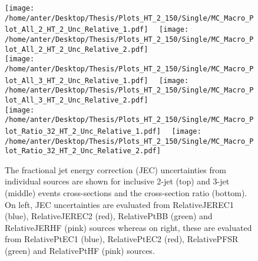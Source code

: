 \begin{figure}[!hbtp]
\hspace*{-5mm}\texttt{[image: /home/anter/Desktop/Thesis/Plots\_HT\_2\_150/Single/MC\_Macro\_Plot\_All\_2\_HT\_2\_Unc\_Relative\_1.pdf]}%
~~\texttt{[image: /home/anter/Desktop/Thesis/Plots\_HT\_2\_150/Single/MC\_Macro\_Plot\_All\_2\_HT\_2\_Unc\_Relative\_2.pdf]}\\
\hspace*{-5mm}\texttt{[image: /home/anter/Desktop/Thesis/Plots\_HT\_2\_150/Single/MC\_Macro\_Plot\_All\_3\_HT\_2\_Unc\_Relative\_1.pdf]}%
~~\texttt{[image: /home/anter/Desktop/Thesis/Plots\_HT\_2\_150/Single/MC\_Macro\_Plot\_All\_3\_HT\_2\_Unc\_Relative\_2.pdf]}\\
\hspace*{-5mm}\texttt{[image: /home/anter/Desktop/Thesis/Plots\_HT\_2\_150/Single/MC\_Macro\_Plot\_Ratio\_32\_HT\_2\_Unc\_Relative\_1.pdf]}%
~~\texttt{[image: /home/anter/Desktop/Thesis/Plots\_HT\_2\_150/Single/MC\_Macro\_Plot\_Ratio\_32\_HT\_2\_Unc\_Relative\_2.pdf]}
\caption[The fractional jet energy correction (JEC) uncertainties from individual sources (Part II).]{The fractional jet energy correction (JEC) uncertainties from individual sources are shown for inclusive 2-jet (top) and 3-jet (middle) events cross-sections and the cross-section ratio \ratio (bottom). On left, JEC uncertainties are evaluated from RelativeJEREC1 (blue), RelativeJEREC2 (red), RelativePtBB (green) and RelativeJERHF (pink) sources whereas on right, these are evaluated from RelativePtEC1 (blue), RelativePtEC2 (red), RelativePFSR (green) and RelativePtHF (pink) sources.}
\label{fig:jes2}
\end{figure}

